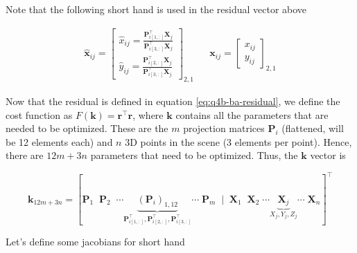 Note that the following short hand is used in the residual vector above

\begin{align}
    \mathbf{\hat{x}}_{ij} = \begin{bmatrix}
        \hat{x}_{ij} = \frac{ \mathbf{P}_{i[1, :]}^\top \mathbf{X}_j }{ \mathbf{P}_{i[3, :]}^\top \mathbf{X}_j }
        \\
        \hat{y}_{ij} = \frac{ \mathbf{P}_{i[2, :]}^\top \mathbf{X}_j }{ \mathbf{P}_{i[3, :]}^\top \mathbf{X}_j }
        \end{bmatrix}_{2, 1}
    &&
    \mathbf{x}_{ij} = \begin{bmatrix}
        x_{ij} \\ y_{ij}
        \end{bmatrix}_{2, 1}
    \nonumber
\end{align}

Now that the residual is defined in equation \ref{eq:q4b-ba-residual}, we define the cost function as $F(\mathbf{k}) = \mathbf{r^\top r}$, where $\mathbf{k}$ contains all the parameters that are needed to be optimized. These are the $m$ projection matrices $\mathbf{P}_i$ (flattened, will be 12 elements each) and $n$ 3D points in the scene (3 elements per point). Hence, there are $12m+3n$ parameters that need to be optimized. Thus, the $\mathbf{k}$ vector is

\begin{equation}
    \mathbf{k}_{12m+3n} = \left [ 
        \mathbf{P}_1 \;\; \mathbf{P}_2 \;\; \cdots
        \underbrace{ \left (\mathbf{P}_i \right )_{1, 12} }_{\mathbf{P}_{i[1,:]}^\top, \mathbf{P}_{i[2,:]}^\top, \mathbf{P}_{i[3,:]}^\top}
        \cdots \; \mathbf{P}_m \;
        \mid \;
        \mathbf{X}_1 \;\; \mathbf{X}_2 \; \cdots
        \underbrace{ \mathbf{X}_j }_{X_j, Y_j, Z_j}
        \cdots \; \mathbf{X}_n
        \right ]^\top
    \label{eq:q4b-ba-params-vect}
\end{equation}

Let's define some jacobians for short hand

